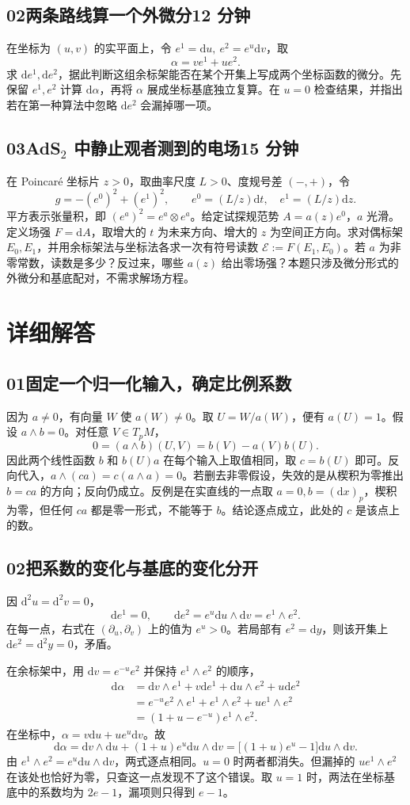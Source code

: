 \documentclass[11pt,a4paper]{article}
\newcommand{\D}{\mathrm d}
\newcommand{\head}[1]{\section*{\color{teal}#1}}
\begin{document}
\subsection*{02\quad 两条路线算一个外微分\hfill 12 分钟}
在坐标为 $(u,v)$ 的实平面上，令 $e^1=\D u,\ e^2=e^u\D v$，取
\[
 \alpha=v e^1+u e^2 .
\]
求 $\D e^1,\D e^2$，据此判断这组余标架能否在某个开集上写成两个坐标函数的微分。先保留 $e^1,e^2$ 计算 $\D\alpha$，再将 $\alpha$ 展成坐标基底独立复算。在 $u=0$ 检查结果，并指出若在第一种算法中忽略 $\D e^2$ 会漏掉哪一项。

\subsection*{03\quad AdS$_2$ 中静止观者测到的电场\hfill 15 分钟}
在 Poincaré 坐标片 $z>0$，取曲率尺度 $L>0$、度规号差 $(-,+)$，令
\[
 g=-(e^0)^2+(e^1)^2,\qquad e^0=(L/z)\D t,\quad e^1=(L/z)\D z .
\]
平方表示张量积，即 $(e^a)^2=e^a\otimes e^a$。给定试探规范势 $A=a(z)e^0$，$a$ 光滑。定义场强 $F=\D A$，取增大的 $t$ 为未来方向、增大的 $z$ 为空间正方向。求对偶标架 $E_0,E_1$，并用余标架法与坐标法各求一次有符号读数 $\mathcal E:=F(E_1,E_0)$。若 $a$ 为非零常数，读数是多少？反过来，哪些 $a(z)$ 给出零场强？本题只涉及微分形式的外微分和基底配对，不需求解场方程。

\newpage
\head{详细解答}
\subsection*{01\quad 固定一个归一化输入，确定比例系数}
因为 $a\ne0$，有向量 $W$ 使 $a(W)\ne0$。取 $U=W/a(W)$，便有 $a(U)=1$。假设 $a\wedge b=0$。对任意 $V\in T_pM$，
\[
 0=(a\wedge b)(U,V)=b(V)-a(V)b(U).
\]
因此两个线性函数 $b$ 和 $b(U)a$ 在每个输入上取值相同，取 $c=b(U)$ 即可。反向代入，$a\wedge(ca)=c(a\wedge a)=0$。若删去非零假设，失效的是从楔积为零推出 $b=ca$ 的方向；反向仍成立。反例是在实直线的一点取 $a=0,b=(\D x)_p$，楔积为零，但任何 $ca$ 都是零一形式，不能等于 $b$。结论逐点成立，此处的 $c$ 是该点上的数。

\subsection*{02\quad 把系数的变化与基底的变化分开}
因 $\D^2u=\D^2v=0$，
\[
 \D e^1=0,\qquad \D e^2=e^u\D u\wedge\D v=e^1\wedge e^2 .
\]
在每一点，右式在 $(\partial_u,\partial_v)$ 上的值为 $e^u>0$。若局部有 $e^2=\D y$，则该开集上 $\D e^2=\D^2y=0$，矛盾。

在余标架中，用 $\D v=e^{-u}e^2$ 并保持 $e^1\wedge e^2$ 的顺序，
\[
\begin{aligned}
 \D\alpha&=\D v\wedge e^1+v\D e^1+\D u\wedge e^2+u\D e^2\\
 &=e^{-u}e^2\wedge e^1+e^1\wedge e^2+u e^1\wedge e^2\\
 &=(1+u-e^{-u})e^1\wedge e^2 .
\end{aligned}
\]
在坐标中，$\alpha=v\D u+ue^u\D v$。故
\[
 \D\alpha=\D v\wedge\D u+(1+u)e^u\D u\wedge\D v
 =\big[(1+u)e^u-1\big]\D u\wedge\D v .
\]
由 $e^1\wedge e^2=e^u\D u\wedge\D v$，两式逐点相同。$u=0$ 时两者都消失。但漏掉的 $u e^1\wedge e^2$ 在该处也恰好为零，只查这一点发现不了这个错误。取 $u=1$ 时，两法在坐标基底中的系数均为 $2e-1$，漏项则只得到 $e-1$。
\end{document}

